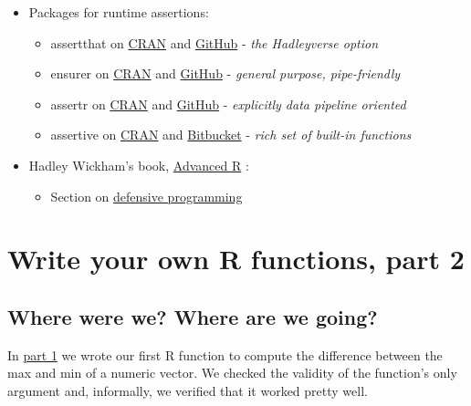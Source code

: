 \documentclass[
]{book}
\providecommand{\tightlist}{%
  \setlength{\itemsep}{0pt}\setlength{\parskip}{0pt}}
\begin{document}
\begin{itemize}
\tightlist
\item
  Packages for runtime assertions:

  \begin{itemize}
  \tightlist
  \item
    assertthat on \href{https://cloud.R-project.org/package=assertthat}{CRAN} and \href{https://github.com/hadley/assertthat}{GitHub} - \emph{the Hadleyverse option}
  \item
    ensurer on \href{https://cloud.R-project.org/package=ensurer}{CRAN} and \href{https://github.com/smbache/ensurer}{GitHub} - \emph{general purpose, pipe-friendly}
  \item
    assertr on \href{https://cloud.R-project.org/package=assertr}{CRAN} and \href{https://github.com/ropensci/assertr}{GitHub} - \emph{explicitly data pipeline oriented}
  \item
    assertive on \href{https://cloud.R-project.org/package=assertive}{CRAN} and \href{https://bitbucket.org/richierocks/assertive/src/master/}{Bitbucket} - \emph{rich set of built-in functions}
  \end{itemize}
\item
  Hadley Wickham's book, \href{http://adv-r.had.co.nz}{Advanced R} \citeyearpar{wickham2015a}:

  \begin{itemize}
  \tightlist
  \item
    Section on \href{http://adv-r.had.co.nz/Exceptions-Debugging.html\#defensive-programming}{defensive programming}
  \end{itemize}
\end{itemize}

\hypertarget{functions-part2}{%
\chapter{Write your own R functions, part 2}\label{functions-part2}}

\hypertarget{where-were-we-where-are-we-going}{%
\section{Where were we? Where are we going?}\label{where-were-we-where-are-we-going}}

In \protect\hyperlink{functions-part1}{part 1} we wrote our first R function to compute the difference between the max and min of a numeric vector. We checked the validity of the function's only argument and, informally, we verified that it worked pretty well.
\end{document}

